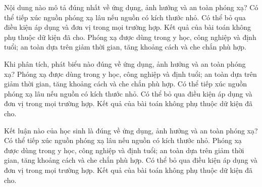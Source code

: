 \begin{ex}
Nội dung nào mô tả đúng nhất về ứng dụng, ảnh hưởng và an toàn phóng xạ?
\choice
{Có thể tiếp xúc nguồn phóng xạ lâu nếu nguồn có kích thước nhỏ.}
{Có thể bỏ qua điều kiện áp dụng và đơn vị trong mọi trường hợp.}
{Kết quả của bài toán không phụ thuộc dữ kiện đã cho.}
{\True Phóng xạ được dùng trong y học, công nghiệp và định tuổi; an toàn dựa trên giảm thời gian, tăng khoảng cách và che chắn phù hợp.}
\end{ex}

\begin{ex}
Khi phân tích, phát biểu nào đúng về ứng dụng, ảnh hưởng và an toàn phóng xạ?
\choice
{\True Phóng xạ được dùng trong y học, công nghiệp và định tuổi; an toàn dựa trên giảm thời gian, tăng khoảng cách và che chắn phù hợp.}
{Có thể tiếp xúc nguồn phóng xạ lâu nếu nguồn có kích thước nhỏ.}
{Có thể bỏ qua điều kiện áp dụng và đơn vị trong mọi trường hợp.}
{Kết quả của bài toán không phụ thuộc dữ kiện đã cho.}
\end{ex}

\begin{ex}
Kết luận nào của học sinh là đúng về ứng dụng, ảnh hưởng và an toàn phóng xạ?
\choice
{Có thể tiếp xúc nguồn phóng xạ lâu nếu nguồn có kích thước nhỏ.}
{\True Phóng xạ được dùng trong y học, công nghiệp và định tuổi; an toàn dựa trên giảm thời gian, tăng khoảng cách và che chắn phù hợp.}
{Có thể bỏ qua điều kiện áp dụng và đơn vị trong mọi trường hợp.}
{Kết quả của bài toán không phụ thuộc dữ kiện đã cho.}
\end{ex}

